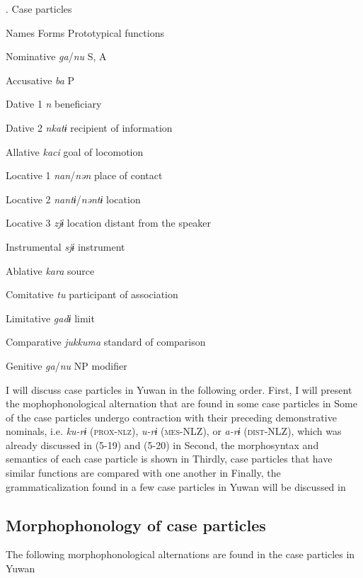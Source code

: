 \begin{styleBeschriftung}
\textmd{. Case particles}
\end{styleBeschriftung}

Names  Forms  Prototypical functions

Nominative  \textit{ga}/\textit{nu}  S, A

Accusative  \textit{ba}  P

Dative 1  \textit{n}  beneficiary

Dative 2  \textit{nkatɨ}  recipient of information

Allative  \textit{kaci}  goal of locomotion

Locative 1  \textit{nan}/\textit{nən}  place of contact

Locative 2  \textit{nantɨ}/\textit{nəntɨ}  location

Locative 3  \textit{zjɨ}  location distant from the speaker

Instrumental  \textit{sjɨ}  instrument

Ablative  \textit{kara}  source

Comitative  \textit{tu}  participant of association

Limitative  \textit{gadɨ}  limit

Comparative  \textit{jukkuma}  standard of comparison

Genitive  \textit{ga}/\textit{nu}  NP modifier

I will discuss case particles in Yuwan in the following order. First, I will present the mophophonological alternation that are found in some case particles in  Some of the case particles undergo contraction with their preceding demonstrative nominals, i.e. \textit{ku-rɨ} (\textsc{prox}-\textsc{nlz}), \textit{u-rɨ} (\textsc{mes}-NLZ), or \textit{a-rɨ} (\textsc{dist}-NLZ), which was already discussed in (5-19) and (5-20) in  Second, the morphosyntax and semantics of each case particle is shown in  Thirdly, case particles that have similar functions are compared with one another in  Finally, the grammaticalization found in a few case particles in Yuwan will be discussed in 

\subsection{Morphophonology of case particles}

The following morphophonological alternations are found in the case particles in Yuwan

